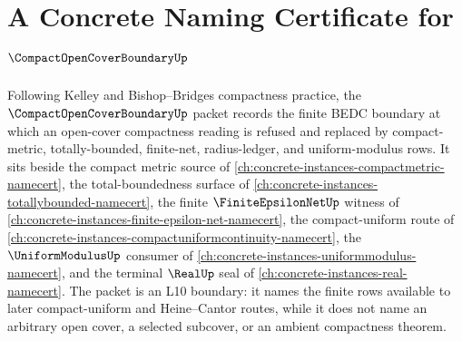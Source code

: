 \chapter{A Concrete Naming Certificate for $\CompactOpenCoverBoundaryUp$}
\label{ch:concrete-instances-compact-open-cover-boundary-namecert}

Following Kelley and Bishop--Bridges compactness practice, the
$\CompactOpenCoverBoundaryUp$ packet records the finite BEDC boundary at which
an open-cover compactness reading is refused and replaced by compact-metric,
totally-bounded, finite-net, radius-ledger, and uniform-modulus rows. It sits
beside the compact metric source of
\autoref{ch:concrete-instances-compactmetric-namecert}, the total-boundedness
surface of \autoref{ch:concrete-instances-totallybounded-namecert}, the finite
$\FiniteEpsilonNetUp$ witness of
\autoref{ch:concrete-instances-finite-epsilon-net-namecert}, the compact-uniform
route of \autoref{ch:concrete-instances-compactuniformcontinuity-namecert},
the $\UniformModulusUp$ consumer of
\autoref{ch:concrete-instances-uniformmodulus-namecert}, and the terminal
$\RealUp$ seal of \autoref{ch:concrete-instances-real-namecert}. The packet is
an L10 boundary: it names the finite rows available to later compact-uniform
and Heine--Cantor routes, while it does not name an arbitrary open cover, a
selected subcover, or an ambient compactness theorem.

